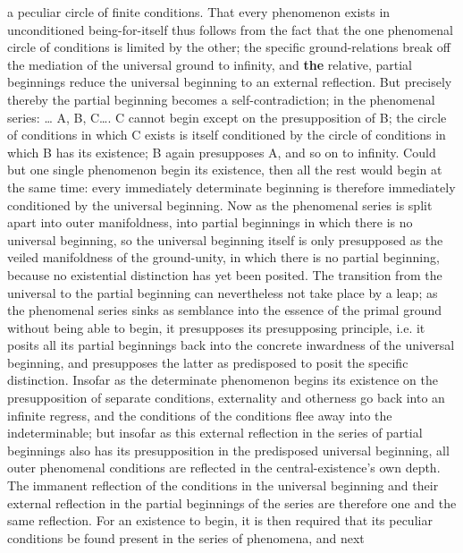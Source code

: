 \documentclass[12pt,a4paper,openany]{book}
\newcommand{\opage}[1]{\marginnote{\footnotesize\textit{[#1]}}}
\begin{document}
a peculiar circle of finite conditions. That every
phenomenon exists in unconditioned being-for-itself thus
follows from the fact that the one phenomenal circle of conditions
is limited by the other; the specific
ground-relations break off the mediation of the universal ground
to infinity, and \textbf{the} relative, partial beginnings
\setcounter{footnote}{0}%
\opage{166}reduce the universal beginning to an external reflection.
But precisely thereby the partial beginning becomes
a self-contradiction; in the phenomenal series:
\dots{} A, B, C\dots{}. C cannot begin except on the presupposition
of B; the circle of conditions in which C
exists is itself conditioned by the circle of conditions
in which B has its existence; B again presupposes
A, and so on to infinity. Could but one
single phenomenon begin its existence, then
all the rest would begin at the same time: every immediately
determinate beginning is therefore immediately conditioned
by the universal beginning. Now as the phenomenal
series is split apart into outer manifoldness,
into partial beginnings in which there is no universal beginning,
so the universal beginning itself is only
presupposed as the veiled manifoldness of the ground-unity,
in which there is no partial beginning, because
no existential distinction has yet been posited.
The transition from the universal to the partial beginning
can nevertheless not take place by a leap; as
the phenomenal series sinks as semblance into the essence of the primal ground
without being able to begin, it presupposes
its presupposing principle, i.e. it posits all its
partial beginnings back into the concrete inwardness of the universal beginning,
and presupposes the latter as predisposed
to posit the specific distinction. Insofar as
the determinate phenomenon begins its existence on
the presupposition of separate conditions, externality
and otherness go back into an infinite regress,
and the conditions of the conditions flee away into the indeterminable;
but insofar as this external reflection
in the series of partial beginnings also has its
presupposition in the predisposed universal beginning,
all outer phenomenal conditions are reflected
\setcounter{footnote}{0}%
\opage{167}in the central-existence's own depth. The immanent
reflection of the conditions in the universal beginning and their
external reflection in the partial beginnings of the series
are therefore one and the same reflection. For an existence
to begin, it is then required that its peculiar conditions
be found present in the series of phenomena, and next
\end{document}
